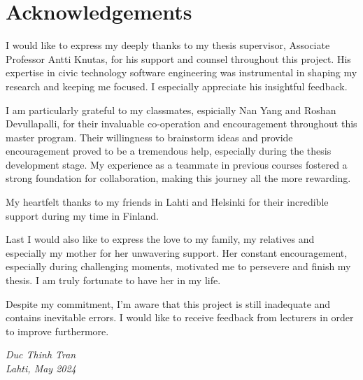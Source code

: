 \section*{Acknowledgements}

I would like to express my deeply thanks to my thesis supervisor, Associate Professor Antti Knutas, for his support and counsel throughout this project. His expertise in civic technology software engineering was instrumental in shaping my research and keeping me focused. I especially appreciate his insightful feedback.

I am particularly grateful to my classmates, espicially Nan Yang and Roshan Devullapalli, for their invaluable co-operation and encouragement throughout this master program. Their willingness to brainstorm ideas and provide encouragement proved to be a tremendous help, especially during the thesis development stage. My experience as a teammate in previous courses fostered a strong foundation for collaboration, making this journey all the more rewarding.

My heartfelt thanks to my friends in Lahti and Helsinki for their incredible support during my time in Finland.

Last I would also like to express the love to my family, my relatives and especially my mother for her unwavering support. Her constant encouragement, especially during challenging moments, motivated me to persevere and finish my thesis. I am truly fortunate to have her in my life.

Despite my commitment, I'm aware that this project is still inadequate and contains inevitable errors. I would like to receive feedback from lecturers in order to improve furthermore.

\textit{Duc Thinh Tran} \\
\textit{Lahti, May 2024}



\clearpage %

